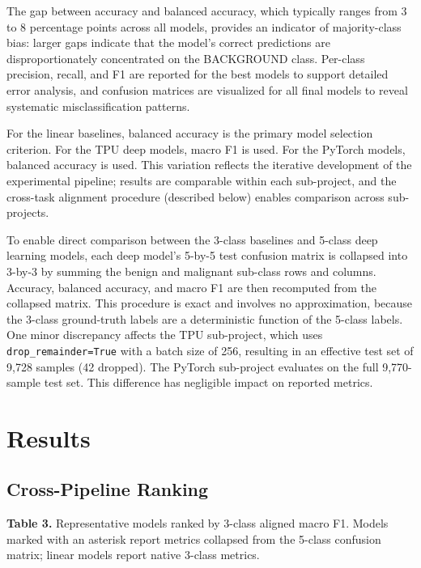 \documentclass[justified,notoc,openany]{tufte-book}
\begin{document}
The gap between accuracy and balanced accuracy, which typically ranges from 3 to 8 percentage points across all models, provides an indicator of majority-class bias: larger gaps indicate that the model's correct predictions are disproportionately concentrated on the BACKGROUND class. Per-class precision, recall, and F1 are reported for the best models to support detailed error analysis, and confusion matrices are visualized for all final models to reveal systematic misclassification patterns.

For the linear baselines, balanced accuracy is the primary model selection criterion. For the TPU deep models, macro F1 is used. For the PyTorch models, balanced accuracy is used. This variation reflects the iterative development of the experimental pipeline; results are comparable within each sub-project, and the cross-task alignment procedure (described below) enables comparison across sub-projects.

To enable direct comparison between the 3-class baselines and 5-class deep learning models, each deep model's 5-by-5 test confusion matrix is collapsed into 3-by-3 by summing the benign and malignant sub-class rows and columns. Accuracy, balanced accuracy, and macro F1 are then recomputed from the collapsed matrix. This procedure is exact and involves no approximation, because the 3-class ground-truth labels are a deterministic function of the 5-class labels. One minor discrepancy affects the TPU sub-project, which uses \texttt{drop\_remainder=True} with a batch size of 256, resulting in an effective test set of 9,728 samples (42 dropped). The PyTorch sub-project evaluates on the full 9,770-sample test set. This difference has negligible impact on reported metrics.

\newpage

\section{Results}\label{results}

\subsection{Cross-Pipeline Ranking}\label{cross-pipeline-ranking}

\textbf{Table 3.} Representative models ranked by 3-class aligned macro F1. Models marked with an asterisk report metrics collapsed from the 5-class confusion matrix; linear models report native 3-class metrics.
\end{document}

